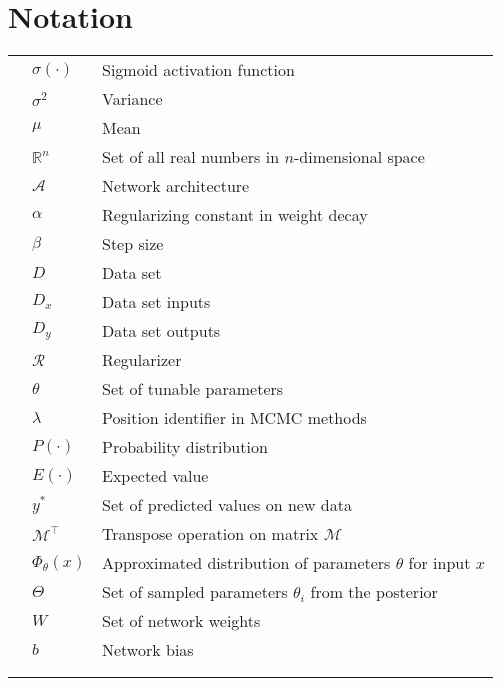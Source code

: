 \chapter{Notation}

\begin{table}[H]
\renewcommand\arraystretch{1.5}

\begin{tabular}{lll}

&$\sigma(\cdot)$ & Sigmoid activation function \\
&$\sigma^2$ & Variance \\
&$\mu$ & Mean \\
&$\mathbb{R}^n$ & Set of all real numbers in $n$-dimensional space \\
&$\mathcal{A}$ & Network architecture \\
&$\alpha$ & Regularizing constant in weight decay \\
&$\beta$ & Step size \\
&$D$ & Data set \\
&$D_x$ & Data set inputs \\
&$D_y$ & Data set outputs \\
&$\mathcal{R}$ & Regularizer \\
&$\theta$ & Set of tunable parameters \\
&$\lambda$ & Position identifier in MCMC  methods \\
&$P(\cdot)$ & Probability distribution \\
&$E(\cdot)$ & Expected value \\
&$y^*$ & Set of predicted values on new data \\
&$\mathcal{M}^\intercal$ & Transpose operation on matrix $\mathcal{M}$ \\
&$\Phi_\theta(x)$ & Approximated distribution of parameters $\theta$ for input $x$\\
&$\Theta$ & Set of sampled parameters $\theta_i$ from the posterior \\
&$W$ & Set of network weights \\
&$b$ & Network bias \\
&$ $ & \\
&$ $ & \\
\end{tabular}

\end{table}
